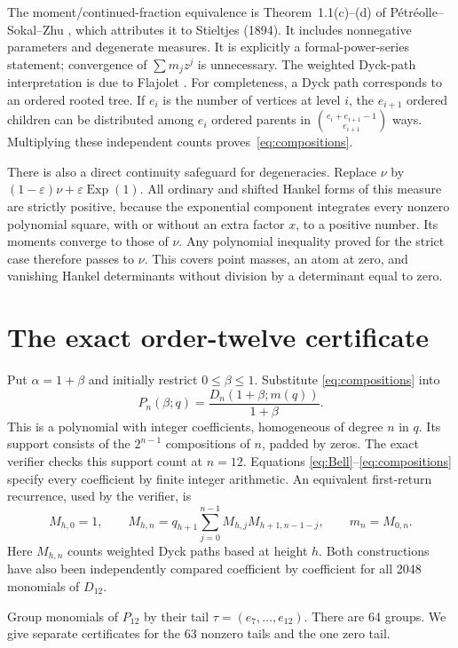 \documentclass[11pt]{article}
\begin{document}
The moment/continued-fraction equivalence is Theorem~1.1(c)--(d) of
P\'etr\'eolle--Sokal--Zhu \cite{PSZ}, which attributes it to Stieltjes (1894).
It includes nonnegative parameters and degenerate measures. It is explicitly
a formal-power-series statement; convergence of $\sum m_jz^j$ is unnecessary.
The weighted Dyck-path interpretation is due to Flajolet \cite{Flajolet}.
For completeness, a Dyck path corresponds to an ordered rooted tree. If $e_i$
is the number of vertices at level $i$, the $e_{i+1}$ ordered children can be
distributed among $e_i$ ordered parents in
$\binom{e_i+e_{i+1}-1}{e_{i+1}}$ ways. Multiplying these independent counts
proves~\eqref{eq:compositions}.

There is also a direct continuity safeguard for degeneracies. Replace $\nu$ by
$(1-\varepsilon)\nu+\varepsilon\operatorname{Exp}(1)$. All ordinary and shifted
Hankel forms of this measure are strictly positive, because the exponential
component integrates every nonzero polynomial square, with or without an
extra factor $x$, to a positive number. Its moments converge to those of $\nu$.
Any polynomial inequality proved for the strict case therefore passes to
$\nu$. This covers point masses, an atom at zero, and vanishing Hankel
determinants without division by a determinant equal to zero.

\section{The exact order-twelve certificate}

Put $\alpha=1+\beta$ and initially restrict $0\le\beta\le1$. Substitute
\eqref{eq:compositions} into
\[
P_n(\beta;q)=\frac{D_n(1+\beta;m(q))}{1+\beta}.
\]
This is a polynomial with integer coefficients, homogeneous of degree $n$ in
$q$. Its support consists of the $2^{n-1}$ compositions of $n$, padded by
zeros. The exact verifier checks this support count at $n=12$. Equations
\eqref{eq:Bell}--\eqref{eq:compositions} specify every coefficient by finite
integer arithmetic. An equivalent first-return recurrence, used by the
verifier, is
\begin{equation}\label{eq:firstreturn}
M_{h,0}=1,\qquad
M_{h,n}=q_{h+1}\sum_{j=0}^{n-1}M_{h,j}M_{h+1,n-1-j},\qquad m_n=M_{0,n}.
\end{equation}
Here $M_{h,n}$ counts weighted Dyck paths based at height $h$. Both
constructions have also been independently compared coefficient by coefficient
for all 2048 monomials of $D_{12}$.

Group monomials of $P_{12}$ by their tail $\tau=(e_7,\ldots,e_{12})$.
There are 64 groups. We give separate certificates for the 63 nonzero tails
and the one zero tail.
\end{document}
